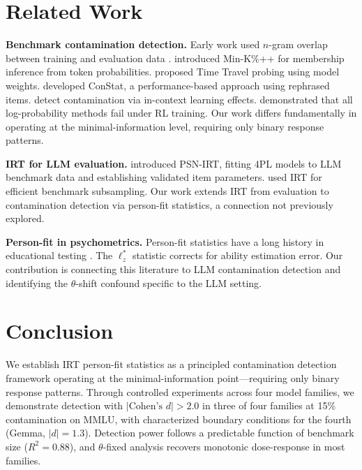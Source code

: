 \documentclass[11pt,a4paper]{article}
\begin{document}
\section{Related Work}

\textbf{Benchmark contamination detection.}
Early work used $n$-gram overlap between training and evaluation data \citep{dodge2021documenting,brown2020language}.
\citet{shi2024detecting} introduced Min-K\%++ for membership inference from token probabilities.
\citet{deng2024investigating} proposed Time Travel probing using model weights.
\citet{oren2024proving} developed ConStat, a performance-based approach using rephrased items.
\citet{dong2024codec} detect contamination via in-context learning effects.
\citet{wang2025rlcontam} demonstrated that all log-probability methods fail under RL training.
Our work differs fundamentally in operating at the minimal-information level, requiring only binary response patterns.

\textbf{IRT for LLM evaluation.}
\citet{psnirt2026} introduced PSN-IRT, fitting 4PL models to LLM benchmark data and establishing validated item parameters.
\citet{polo2024tinybenchmarks} used IRT for efficient benchmark subsampling.
Our work extends IRT from evaluation to contamination detection via person-fit statistics, a connection not previously explored.

\textbf{Person-fit in psychometrics.}
Person-fit statistics have a long history in educational testing \citep{drasgow1985appropriateness,meijer1996person}.
The $\ell_z^*$ statistic \citep{snijders2001item} corrects for ability estimation error.
Our contribution is connecting this literature to LLM contamination detection and identifying the $\theta$-shift confound specific to the LLM setting.

\section{Conclusion}

We establish IRT person-fit statistics as a principled contamination detection framework operating at the minimal-information point---requiring only binary response patterns.
Through controlled experiments across four model families, we demonstrate detection with $|\text{Cohen's } d| > 2.0$ in three of four families at 15\% contamination on MMLU, with characterized boundary conditions for the fourth (Gemma, $|d|=1.3$).
Detection power follows a predictable function of benchmark size ($R^2 = 0.88$), and $\theta$-fixed analysis recovers monotonic dose-response in most families.
\end{document}
